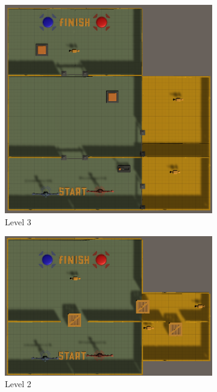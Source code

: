 \begin{figure}[h!]
\begin{subfigure}[b]{0.45\linewidth}
        \includegraphics[width=\linewidth]{images/level_3.png}
        \caption{Level 3}
        \label{fig:level 3}
      \end{subfigure}
    \begin{subfigure}[b]{0.45\linewidth}
        \includegraphics[width=\linewidth]{images/level_2.png}
        \caption{Level 2}
        \label{fig:level 2}
      \end{subfigure}
    \begin{subfigure}[b]{0.45\linewidth}

\end{subfigure}
\end{figure}
